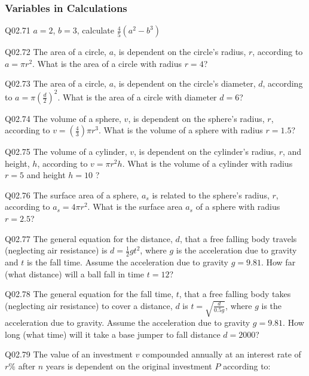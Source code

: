 \documentclass{book}
\newenvironment{problems}{}{}  %
\begin{document}
    




    
        \begin{problems}
        \hypertarget{variables-in-calculations}{%
\subsubsection{Variables in
Calculations}\label{variables-in-calculations}}

Q02.71 \(a = 2\), \(b = 3\), calculate \(\frac{4}{5}(a^2 - b^3)\)

Q02.72 The area of a circle, \(a\), is dependent on the circle's radius,
\(r\), according to \(a=\pi r^2\). What is the area of a circle with
radius \(r=4\)?

Q02.73 The area of a circle, \(a\), is dependent on the circle's
diameter, \(d\), according to \(a=\pi (\frac{d}{2})^2\). What is the
area of a circle with diameter \(d=6\)?

Q02.74 The volume of a sphere, \(v\), is dependent on the sphere's
radius, \(r\), according to \(v=(\frac{4}{3})\pi r^3\). What is the
volume of a sphere with radius \(r=1.5\)?

Q02.75 The volume of a cylinder, \(v\), is dependent on the cylinder's
radius, \(r\), and height, \(h\), according to \(v=\pi r^2 h\). What is
the volume of a cylinder with radius \(r=5\) and height \(h=10\) ?

Q02.76 The surface area of a sphere, \(a_s\) is related to the sphere's
radius, \(r\), according to \(a_s=4\pi r^2\). What is the surface area
\(a_s\) of a sphere with radius \(r=2.5\)?

Q02.77 The general equation for the distance, \(d\), that a free falling
body travels (neglecting air resistance) is \(d = \frac{1}{2}gt^2\),
where \(g\) is the acceleration due to gravity and \(t\) is the fall
time. Assume the acceleration due to gravity \(g = 9.81\). How far (what
distance) will a ball fall in time \(t = 12\)?

Q02.78 The general equation for the fall time, \(t\), that a free
falling body takes (neglecting air resistance) to cover a distance,
\(d\) is \(t = \sqrt{\frac{d}{0.5g}}\), where \(g\) is the acceleration
due to gravity. Assume the acceleration due to gravity \(g = 9.81\). How
long (what time) will it take a base jumper to fall distance
\(d = 2000\)?

Q02.79 The value of an investment \(v\) compounded annually at an
interest rate of \(r\%\) after \(n\) years is dependent on the original
investment \(P\) according to:


\end{problems}
\end{document}
